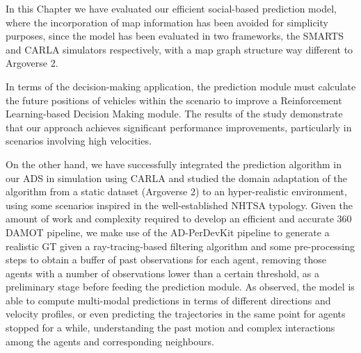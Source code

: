 In this Chapter we have evaluated our efficient social-based prediction model, where the incorporation of map information has been avoided for simplicity purposes, since the model has been evaluated in two frameworks, the \ac{SMARTS} and \ac{CARLA} simulators respectively, with a map graph structure way different to Argoverse 2.

In terms of the decision-making application, the prediction module must calculate the future positions of vehicles within the scenario to improve a Reinforcement Learning-based Decision Making module. The results of the study demonstrate that our approach achieves significant performance improvements, particularly in scenarios involving high velocities.

On the other hand, we have successfully integrated the prediction algorithm in our \ac{ADS} in simulation using CARLA and studied the domain adaptation of the algorithm from a static dataset (Argoverse 2) to an hyper-realistic environment, using some scenarios inspired in the well-established \ac{NHTSA} typology. Given the amount of work and complexity required to develop an efficient and accurate 360 \degree \ac{DAMOT} pipeline, we make use of the \ac{AD-PerDevKit} pipeline to generate a realistic \ac{GT} given a ray-tracing-based filtering algorithm and some pre-processing steps to obtain a buffer of past observations for each agent, removing those agents with a number of observations lower than a certain threshold, as a preliminary stage before feeding the prediction module. As observed, the model is able to compute multi-modal predictions in terms of different directions and velocity profiles, or even predicting the trajectories in the same point for agents stopped for a while, understanding the past motion and complex interactions among the agents and corresponding neighbours. 


